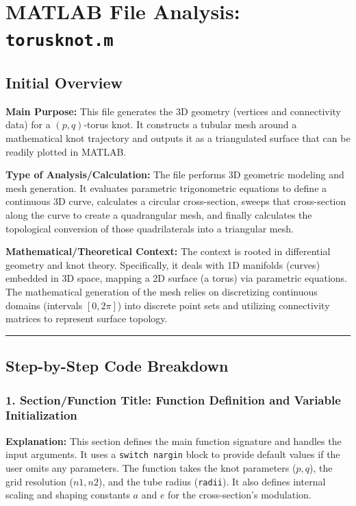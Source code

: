 
\chapter{MATLAB File Analysis: \texttt{torusknot.m}}
\date{}


\maketitle

\section*{Initial Overview}

\textbf{Main Purpose:} This file generates the 3D geometry (vertices and connectivity data) for a $(p,q)$-torus knot. It constructs a tubular mesh around a mathematical knot trajectory and outputs it as a triangulated surface that can be readily plotted in MATLAB.

\textbf{Type of Analysis/Calculation:} The file performs 3D geometric modeling and mesh generation. It evaluates parametric trigonometric equations to define a continuous 3D curve, calculates a circular cross-section, sweeps that cross-section along the curve to create a quadrangular mesh, and finally calculates the topological conversion of those quadrilaterals into a triangular mesh.

\textbf{Mathematical/Theoretical Context:} The context is rooted in differential geometry and knot theory. Specifically, it deals with 1D manifolds (curves) embedded in 3D space, mapping a 2D surface (a torus) via parametric equations. The mathematical generation of the mesh relies on discretizing continuous domains (intervals $[0, 2\pi]$) into discrete point sets and utilizing connectivity matrices to represent surface topology. 

\vspace{0.5cm}
\hrule
\vspace{0.5cm}

\section*{Step-by-Step Code Breakdown}

\subsection*{1. Section/Function Title: Function Definition and Variable Initialization}
\textbf{Explanation:} This section defines the main function signature and handles the input arguments. It uses a \texttt{switch nargin} block to provide default values if the user omits any parameters. The function takes the knot parameters ($p, q$), the grid resolution ($n1, n2$), and the tube radius (\texttt{radii}). It also defines internal scaling and shaping constants $a$ and $e$ for the cross-section's modulation.

